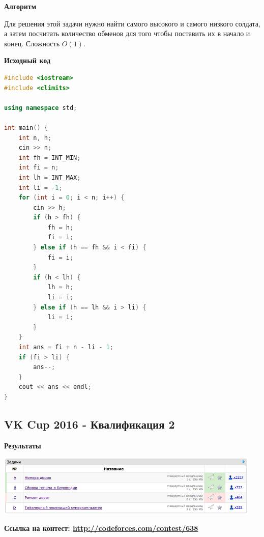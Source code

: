 \documentclass[a4paper,12pt]{article}
\begin{document}
\textbf{{\large Алгоритм}}

Для решения этой задачи нужно найти самого высокого и самого низкого солдата, а затем посчитать количество обменов для того чтобы поставить их в начало и конец. Сложность $O(1)$.\\

\newpage

\textbf{{\large Исходный код}} \\
\begin{lstlisting}[language=C++]
#include <iostream>
#include <climits>

using namespace std;

int main() {
    int n, h;
    cin >> n;
    int fh = INT_MIN;
    int fi = n;
    int lh = INT_MAX;
    int li = -1;
    for (int i = 0; i < n; i++) {
        cin >> h;
        if (h > fh) {
            fh = h;
            fi = i;
        } else if (h == fh && i < fi) {
            fi = i;
        }
        if (h < lh) {
            lh = h;
            li = i;
        } else if (h == lh && i > li) {
            li = i;
        }
    }
    int ans = fi + n - li - 1;
    if (fi > li) {
        ans--;
    }
    cout << ans << endl;
}
\end{lstlisting}



%
%

\newpage
\subsection{VK Cup 2016 - Квалификация 2}

\textbf{{\large Результаты}} \\
\begin{center}
\includegraphics[width=0.95\textwidth]{VK_Q2/result.png}\\ [1cm]
\end{center}

\textbf{{\large Ссылка на контест: \url{http://codeforces.com/contest/638}}}
\end{document}
